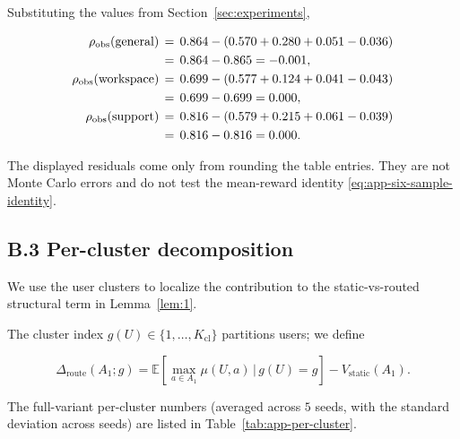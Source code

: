 \documentclass{article} %
\begin{document}
Substituting the values from Section~\ref{sec:experiments},

\begin{align}
\label{eq:app-residual-num}
\rho_{\mathrm{obs}}(\mathrm{general})  &\,=\, 0.864 - (0.570 + 0.280 + 0.051 - 0.036)\notag\\
                        &\,=\, 0.864 - 0.865 = -0.001,\\
\rho_{\mathrm{obs}}(\mathrm{workspace})&\,=\, 0.699 - (0.577 + 0.124 + 0.041 - 0.043)\notag\\
                        &\,=\, 0.699 - 0.699 = 0.000,\\
\rho_{\mathrm{obs}}(\mathrm{support})  &\,=\, 0.816 - (0.579 + 0.215 + 0.061 - 0.039)\notag\\
                        &\,=\, 0.816 - 0.816 = 0.000.
\end{align}

The displayed residuals come only from rounding the table entries. They are
not Monte Carlo errors and do not test the mean-reward identity
\eqref{eq:app-six-sample-identity}.

\subsection{B.3 Per-cluster decomposition}

\label{app:per-cluster}

We use the user clusters to localize the contribution to the static-vs-routed
structural term in Lemma~\ref{lem:1}.

The cluster index
\(g(U)\in\{1,\dots,K_{\mathrm{cl}}\}\) partitions users; we define

\begin{equation}
\label{eq:app-per-cluster-het}
\Delta_{\mathrm{route}}(A_1;g) = \mathbb{E}\!\left[\max_{a\in A_1}\mu(U,a)\,\bigg|\,g(U)=g\right] - V_{\mathrm{static}}(A_1).
\end{equation}

The full-variant per-cluster numbers (averaged across $5$ seeds, with the standard deviation across seeds) are listed in Table~\ref{tab:app-per-cluster}.
\end{document}

